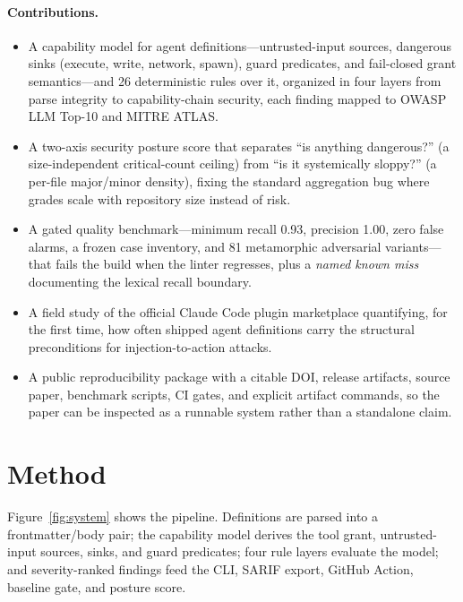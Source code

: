 \documentclass[11pt]{article}
\begin{document}
\paragraph{Contributions.}
\begin{itemize}\setlength\itemsep{2pt}
  \item A capability model for agent definitions---untrusted-input sources, dangerous sinks
    (execute, write, network, spawn), guard predicates, and fail-closed grant semantics---and 26
    deterministic rules over it, organized in four layers from parse integrity to capability-chain
    security, each finding mapped to OWASP LLM Top-10 and MITRE ATLAS.
  \item A two-axis security posture score that separates ``is anything dangerous?'' (a
    size-independent critical-count ceiling) from ``is it systemically sloppy?'' (a per-file
    major/minor density), fixing the standard aggregation bug where grades scale with repository
    size instead of risk.
  \item A gated quality benchmark---minimum recall 0.93, precision 1.00, zero false alarms, a
    frozen case inventory, and 81 metamorphic adversarial variants---that fails the build when the
    linter regresses, plus a \emph{named known miss} documenting the lexical recall boundary.
  \item A field study of the official Claude Code plugin marketplace quantifying, for the first
    time, how often shipped agent definitions carry the structural preconditions for
    injection-to-action attacks.
  \item A public reproducibility package with a citable DOI, release artifacts, source paper,
    benchmark scripts, CI gates, and explicit artifact commands, so the paper can be inspected as a
    runnable system rather than a standalone claim.
\end{itemize}

\section{Method}

Figure~\ref{fig:system} shows the pipeline. Definitions are parsed into a frontmatter/body pair;
the capability model derives the tool grant, untrusted-input sources, sinks, and guard predicates;
four rule layers evaluate the model; and severity-ranked findings feed the CLI, SARIF export,
GitHub Action, baseline gate, and posture score.
\end{document}
